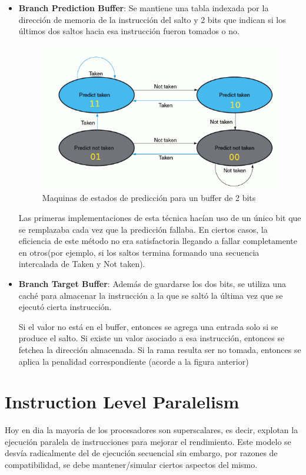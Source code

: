 \begin{itemize}
	\item\textbf{Branch Prediction Buffer}: Se mantiene una tabla indexada por la dirección de memoria de la instrucción del salto y 2 bits que indican si los últimos dos saltos hacia esa instrucción fueron tomados o no.
	
	\begin{figure}[h]
		\centering
		\includegraphics[width=0.7\linewidth]{imagenes/2bit-buffer-prediction}
		\caption{Maquinas de estados de predicción para un buffer de 2 bits}
		\label{fig:2bit-buffer-prediction}
	\end{figure}

	Las primeras implementaciones de esta técnica hacían uso de un único bit que se remplazaba cada vez que la predicción fallaba. En ciertos casos, la eficiencia de este método no era satisfactoria llegando a fallar completamente en otros(por ejemplo, si los saltos termina formando una secuencia intercalada de Taken y Not taken).
	\item \textbf{Branch Target Buffer}: Además de guardarse los dos bits, se utiliza una caché para almacenar la instrucción a la que se saltó la última vez que se ejecutó cierta instrucción. 
	
	Si el valor no está en el buffer, entonces se agrega una entrada solo si se produce el salto. Si existe un valor asociado a esa instrucción, entonces se fetchea la dirección almacenada. Si la rama resulta ser no tomada, entonces se aplica la penalidad correspondiente (acorde a la figura anterior)
\end{itemize}

\newpage
\section{Instruction Level Paralelism}
Hoy en dia la mayoría de los procesadores son superscalares, es decir, explotan la ejecución paralela de instrucciones para mejorar el rendimiento. Este modelo se desvía radicalmente del de ejecución secuencial sin embargo, por razones de compatibilidad, se debe mantener/simular ciertos aspectos del mismo.

